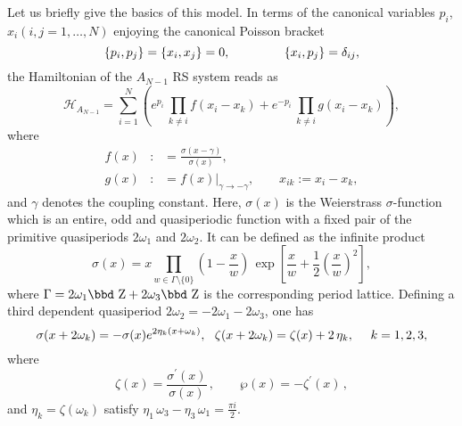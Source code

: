 \documentclass[a4paper,12pt]{article}
\begin{document}
Let us briefly give the basics of this model. In terms of
the canonical variables $p_{i}$, $x_{i}(i,j=1,\ldots ,N)$
enjoying the canonical Poisson bracket
\begin{equation}
\{p_{i},p_{j}\}=\{x_{i},x_{j}\}=0,\mbox{$ \ \ \ \ \ \ \ \ \ \ \ \ \ $}
\{x_{i},p_{j}\}=\delta _{ij},  \label{poisson}
\end{equation}
the Hamiltonian of the $A_{N-1}$ RS system reads as
\begin{equation}
\mathcal{H}_{A_{N-1}}=\sum_{i=1}^{N}\left( e^{p_{i}}\,\prod_{k\neq
i}f(x_{i}-x_{k})+e^{-p_{i}}\,\prod_{k\neq
i}g(x_{i}-x_{k})\right),
\label{anhami}
\end{equation}
where
\begin{eqnarray}
f(x) &:&=\frac{\sigma (x-\gamma )}{\sigma (x)},	 \nonumber
\\ g(x) &:&=f(x)|_{\gamma \rightarrow -\gamma },\ \ \ \ \ \
\ \ \ x_{ik}:=x_{i}-x_{k},  \label{Weyl}
\end{eqnarray}
and $\gamma $ denotes the coupling constant. Here, $\sigma
(x)$ is the Weierstrass $\sigma $-function which is an
entire, odd and quasiperiodic function with a fixed pair of
the primitive quasiperiods $2\omega _{1}$ and $ 2\omega
_{2}$. It can be defined as the infinite product
\[
\sigma (x)=x\prod_{w\in \Gamma \setminus \{0\}}\left(
1-\frac{x}{w}\right)\,\exp \left[ \frac{x}{w}+\frac{1}{2}
(\frac{x}{w})^{2}\right],
\]
where $\Gamma =2\omega _{1}\hbox{\bbd Z}+2\omega
_{3}\hbox{\bbd Z}$ is the corresponding period lattice.
Defining a third dependent quasiperiod $ 2\omega
_{2}=-2\omega _{1}-2\omega _{3}$, one has
\[
\sigma (x+2\omega _{k})=-\sigma (x)e^{2\eta _{k}(x+\omega _{k})},
~~\zeta(x+2\omega _{k})=\zeta (x)+2\,\eta _{k},\mbox{$ \ \ \ \
$}k=1,2,3,
\]
where
\[
\zeta (x)=\frac{\sigma ^{\prime }(x)}{\sigma (x)}\,,\qquad \wp (x)=-\zeta
^{\prime }(x)\,,
\]
and $\eta _{k}=\zeta (\omega _{k})$ satisfy $\eta
_{1}\,\omega _{3}-\eta
_{3}\,\omega _{1}=\frac{\pi i}{2}$.
\end{document}
